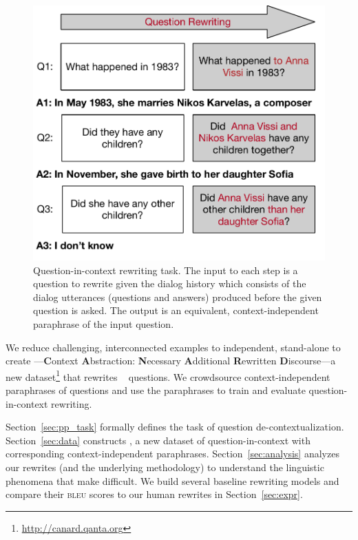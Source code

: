 \begin{figure}[t!]
	\includegraphics[width=\linewidth]{2019_emnlp_sequentialqa/figures/F1_OmniVersion.pdf}
	\caption{Question-in-context rewriting task. The input to each step
	is a question to rewrite given the dialog history which consists
	of the dialog utterances (questions and answers)  
	produced before the given question is asked. The output is an equivalent, context-independent paraphrase of the input question.}
	\label{fig:example_convo}
\end{figure}

We reduce challenging, interconnected  examples to
independent, stand-alone  to create
\name{}---\textbf{C}ontext \textbf{A}bstraction: \textbf{N}ecessary
\textbf{A}dditional \textbf{R}ewritten \textbf{D}iscourse---a new
dataset\footnote{\url{http://canard.qanta.org}} that rewrites
\abr{\quac}~\cite{ChoiQuAC2018} questions.
We crowdsource context-independent paraphrases of \abr{\quac}
questions and use the paraphrases to train and evaluate
question-in-context rewriting.
 



Section~\ref{sec:pp_task} formally defines the task of question
de-contextualization.
Section~\ref{sec:data} constructs \name{}, a new dataset of
question-in-context with corresponding context-independent
paraphrases.
Section~\ref{sec:analysis} analyzes our rewrites (and the underlying
methodology) to understand the linguistic phenomena that make
 difficult.
We build several baseline rewriting models and compare their
\textsc{bleu} scores to our human rewrites in Section~\ref{sec:expr}.
 